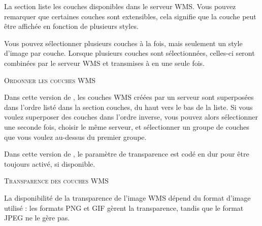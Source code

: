  \label{ogc-wms-layers}

La section  liste les couches disponibles dans le serveur WMS. Vous
pouvez remarquer que certaines couches sont extensibles, cela signifie que la
couche peut être affichée en fonction de plusieurs styles.

Vous pouvez sélectionner plusieurs couches à la fois, mais seulement un style 
d'image par couche. Lorsque plusieurs couches sont sélectionnées, celles-ci 
seront combinées par le serveur WMS et transmises à \qg en une seule fois.

\begin{Tip}[ht]\caption{\textsc{Ordonner les couches WMS}}
Dans cette version de \qg, les couches WMS créées par un serveur sont 
superposées dans l'ordre listé dans la section couches, du haut vers le bas de 
la liste. Si vous voulez superposer des couches dans l'ordre inverse, vous 
pouvez alors sélectionner  une seconde fois, choisir le même serveur, et sélectionner un groupe de 
couches que vous voulez au-dessus du premier groupe.
\end{Tip}

\label{ogc-wms-transparency}

Dans cette version de \qg, le paramètre de transparence est codé en dur pour 
être toujours activé, si disponible.

\begin{Tip}[ht]\caption{\textsc{Transparence des couches WMS}}
La disponibilité de la transparence de l'image WMS dépend du format
d'image utilisé : les formats PNG et GIF gèrent la transparence, tandis que le
format JPEG ne le gère pas. 
\end{Tip}

